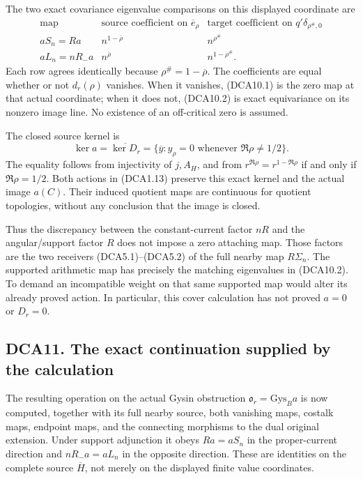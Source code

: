 The two exact covariance eigenvalue comparisons on this displayed
coordinate are \[
\begin{array}{c|c|c}
\text{map}&\text{source coefficient on }\overline e_\rho
&\text{target coefficient on }q'\delta_{\rho^\#,0}\\\hline
aS_n=Ra&n^{1-\overline\rho}&n^{\rho^\#}\\
aL_n=nR_-a&n^{\overline\rho}&n^{1-\rho^\#}.
\end{array}
\tag{DCA10.2}
\] Each row agrees identically because \(\rho^\#=1-\overline\rho\). The
coefficients are equal whether or not \(d_r(\rho)\) vanishes. When it
vanishes, (DCA10.1) is the zero map at that actual coordinate; when it
does not, (DCA10.2) is exact equivariance on its nonzero image line. No
existence of an off-critical zero is assumed.

The closed source kernel is \[
\ker a=\overline{\ker D_r}
=\{\overline y:y_\rho=0\text{ whenever }\Re\rho\ne1/2\}.
\tag{DCA10.3}
\] The equality follows from injectivity of \(j,A_H\), and from
\(r^{\Re\rho}=r^{1-\Re\rho}\) if and only if \(\Re\rho=1/2\). Both
actions in (DCA1.13) preserve this exact kernel and the actual image
\(a(C)\). Their induced quotient maps are continuous for quotient
topologies, without any conclusion that the image is closed.

Thus the discrepancy between the constant-current factor \(nR\) and the
angular/support factor \(R\) does not impose a zero attaching map. Those
factors are the two receivers (DCA5.1)--(DCA5.2) of the full nearby map
\(R\Sigma_n\). The supported arithmetic map has precisely the matching
eigenvalues in (DCA10.2). To demand an incompatible weight on that same
supported map would alter its already proved action. In particular, this
cover calculation has not proved \(a=0\) or \(D_r=0\).

\subsection{DCA11. The exact continuation supplied by the
calculation}\label{dca11.-the-exact-continuation-supplied-by-the-calculation}

The resulting operation on the actual Gysin obstruction
\(\mathfrak o_r=\mathrm{Gys}_Ba\) is now computed, together with its
full nearby source, both vanishing maps, costalk maps, endpoint maps,
and the connecting morphisms to the dual original extension. Under
support adjunction it obeys \(Ra=aS_n\) in the proper-current direction
and \(nR_-a=aL_n\) in the opposite direction. These are identities on
the complete source \(\overline H\), not merely on the displayed finite
value coordinates.

